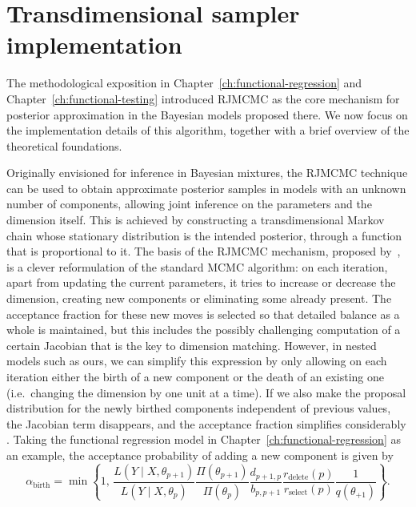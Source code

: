 \chapter{Transdimensional sampler implementation}\label{ch:rjmcmc}

The methodological exposition in Chapter~\ref{ch:functional-regression} and Chapter~\ref{ch:functional-testing} introduced \acs{RJMCMC} as the core mechanism for posterior approximation in the Bayesian models proposed there. We now focus on the implementation details of this algorithm, together with a brief overview of the theoretical foundations.

Originally envisioned for inference in Bayesian mixtures, the \acs{RJMCMC} technique can be used to obtain approximate posterior samples in models with an unknown number of components, allowing joint inference on the parameters and the dimension itself. This is achieved by constructing a transdimensional Markov chain whose stationary distribution is the intended posterior, through a function that is proportional to it. The basis of the \acs{RJMCMC} mechanism, proposed by~\citet{green1995reversible}, is a clever reformulation of the standard \acf{MCMC} algorithm: on each iteration, apart from updating the current parameters, it tries to increase or decrease the dimension, creating new components or eliminating some already present. The acceptance fraction for these new moves is selected so that detailed balance as a whole is maintained, but this includes the possibly challenging computation of a certain Jacobian that is the key to dimension matching. However, in nested models such as ours, we can simplify this expression by only allowing on each iteration either the birth of a new component or the death of an existing one (i.e.~changing the dimension by one unit at a time). If we also make the proposal distribution for the newly birthed components independent of previous values, the Jacobian term disappears, and the acceptance fraction simplifies considerably \citep{richardson1997bayesian}. Taking the functional regression model in Chapter~\ref{ch:functional-regression} as an example, the acceptance probability of adding a new component is given by
\[
  \alpha_\text{birth} = \min\left\{1,\, \frac{L(Y \mid X, \theta_{p+1})}{L(Y\mid X, \theta_p)}\frac{\Pi(\theta_{p+1})}{\Pi(\theta_p)}\frac{d_{p+1, p}}{b_{p, p+1}}\frac{r_{\text{delete}}(p)}{r_{\text{select}}(p)}\frac{1}{q(\theta_{+1})}\right\}.
\]
